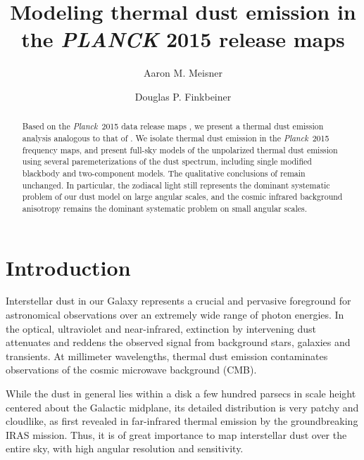 \documentclass{emulateapj}
\newcommand{\PLANCK}{{\it Planck}}
\begin{document}
\title{Modeling thermal dust emission in the {\it PLANCK} 2015 release maps}
\author{Aaron M. Meisner}
\author{Douglas P. Finkbeiner}

\begin{abstract}

Based on the \PLANCK~2015 data release maps \citep{planck2015}, we present a 
thermal dust emission analysis analogous to that of \cite{meisner15}. We 
isolate thermal dust emission in the \PLANCK~2015 frequency maps, and present 
full-sky models of the unpolarized thermal dust emission using several 
paremeterizations of the dust spectrum, including single modified blackbody and
two-component models. The qualitative conclusions of \cite{meisner15} remain 
unchanged. In particular, the zodiacal light still represents the dominant 
systematic problem of our dust model on large angular scales, and the cosmic 
infrared background anisotropy remains the dominant systematic problem on small
angular scales.


\end{abstract}


\section{Introduction}
Interstellar dust in our Galaxy represents a crucial and pervasive foreground
for astronomical observations over an extremely wide range of photon energies.
In the optical, ultraviolet and near-infrared, extinction by intervening dust
attenuates and reddens the observed signal from background stars, galaxies and
transients. At millimeter wavelengths, thermal dust emission contaminates
observations of the cosmic microwave background (CMB).

While the dust in general lies within a disk a few hundred parsecs in scale 
height centered about the Galactic midplane, its detailed distribution is very 
patchy and cloudlike, as first revealed in far-infrared thermal emission by the
groundbreaking IRAS mission. Thus, it is of great importance to map 
interstellar dust over the entire sky, with high angular resolution and 
sensitivity.
\end{document}
